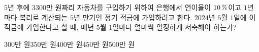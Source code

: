 $5$년 후에 $3300$만 원짜리 자동차를 구입하기 위하여 은행에서 연이율이 $10\mkern3mu \%$이고 $1$년마다 복리로 계산되는 $5$년 만기인 정기 적금에 가입하려고 한다. $2024$년 $5$월 $1$일에 이 적금에 가입한다고 할 때, 매년 $5$월 $1$일마다 얼마씩 일정하게 저축해야 하는가? 
\begin{choices32}{$300$만 원}{$350$만 원}{$400$만 원}{$450$만 원}{$500$만 원}\end{choices32}
